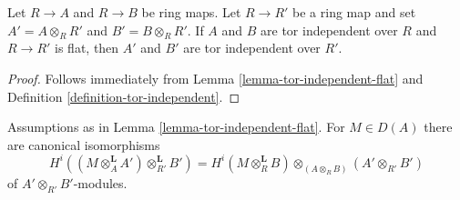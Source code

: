\begin{lemma}
\label{lemma-flat-base-change-tor-independent}
Let $R \to A$ and $R \to B$ be ring maps. Let $R \to R'$ be a
ring map and set $A' = A \otimes_R R'$ and $B' = B \otimes_R R'$.
If $A$ and $B$ are tor independent over $R$ and $R \to R'$ is flat,
then $A'$ and $B'$ are tor independent over $R'$.
\end{lemma}

\begin{proof}
Follows immediately from Lemma \ref{lemma-tor-independent-flat}
and Definition \ref{definition-tor-independent}.
\end{proof}

\begin{lemma}
\label{lemma-lemma-tor-independent-flat-compare}
Assumptions as in Lemma \ref{lemma-tor-independent-flat}.
For $M \in D(A)$ there are canonical isomorphisms
$$
H^i((M \otimes_A^\mathbf{L} A') \otimes_{R'}^\mathbf{L} B') =
H^i(M \otimes_R^\mathbf{L} B) \otimes_{(A \otimes_R B)} (A' \otimes_{R'} B')
$$
of $A' \otimes_{R'} B'$-modules.
\end{lemma}

